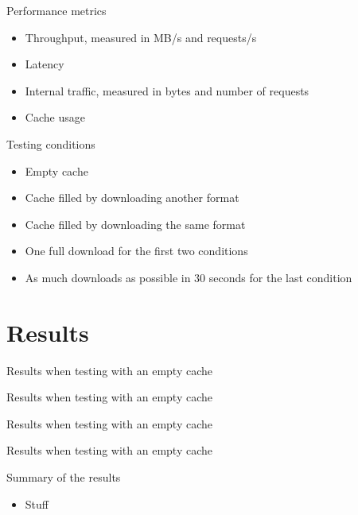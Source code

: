 \documentclass[xcolor=svgnames,handout]{beamer}
\begin{document}
\begin{frame}{Performance metrics}
    \begin{itemize}
        \item Throughput, measured in MB/s and requests/s
        \item Latency
        \item Internal traffic, measured in bytes and number of requests
        \item Cache usage
    \end{itemize}
\end{frame}


\begin{frame}{Testing conditions}
    \begin{itemize}
        \item Empty cache
        \item Cache filled by downloading another format
        \item Cache filled by downloading the same format
        \item One full download for the first two conditions
        \item As much downloads as possible in 30 seconds for the last condition
    \end{itemize}
\end{frame}

\section{Results}
\begin{frame}{Results when testing with an empty cache}
    
\end{frame}

\begin{frame}{Results when testing with an empty cache}
    
\end{frame}

\begin{frame}{Results when testing with an empty cache}
    
\end{frame}

\begin{frame}{Results when testing with an empty cache}
    
\end{frame}

\begin{frame}{Summary of the results}
    \begin{itemize}
        \item Stuff
    \end{itemize}
\end{frame}
\end{document}
